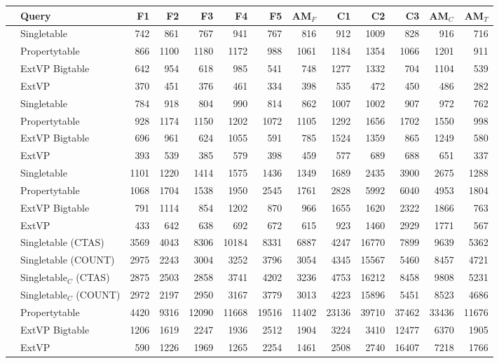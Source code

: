 \documentclass[
  a4paper,
  twocolumn
]{scrartcl}
\begin{document}
\begin{table*}[htb!]
  	\begin{tabular*}{\textwidth}{ @{\extracolsep{\fill}} llrrrrr|r|rrr|r|r }
		\midrule
		& Query & F1 & F2 & F3 & F4 & F5 & AM$_F$ & C1 & C2 & C3 & AM$_C$ & AM$_T$ \\ 
		\midrule
		\multirow{4}{*}{\rotatebox{90}{SF10}}  
		& Singletable & 742 & 861 & 767 & 941 & 767 & 816 & 912 & 1009 & 828 & 916 & 716 \\ 
		& Propertytable & 866 & 1100 & 1180 & 1172 & 988 & 1061 & 1184 & 1354 & 1066 & 1201 & 911 \\ 
		& ExtVP Bigtable & 642 & 954 & 618 & 985 & 541 & 748 & 1277 & 1332 & 704 & 1104 & 539 \\ 
		& ExtVP & 370 & 451 & 376 & 461 & 334 & 398 & 535 & 472 & 450 & 486 & 282 \\ 
		\midrule
		\multirow{4}{*}{\rotatebox{90}{SF100}} 
		& Singletable & 784 & 918 & 804 & 990 & 814 & 862 & 1007 & 1002 & 907 & 972 & 762 \\ 
		& Propertytable & 928 & 1174 & 1150 & 1202 & 1072 & 1105 & 1292 & 1656 & 1702 & 1550 & 998 \\ 
		& ExtVP Bigtable & 696 & 961 & 624 & 1055 & 591 & 785 & 1524 & 1359 & 865 & 1249 & 580 \\ 
		& ExtVP & 393 & 539 & 385 & 579 & 398 & 459 & 577 & 689 & 688 & 651 & 337 \\ 
		\midrule
		\multirow{4}{*}{\rotatebox{90}{SF1000}} 
		& Singletable & 1101 & 1220 & 1414 & 1575 & 1436 & 1349 & 1689 & 2435 & 3900 & 2675 & 1288 \\ 
		& Propertytable & 1068 & 1704 & 1538 & 1950 & 2545 & 1761 & 2828 & 5992 & 6040 & 4953 & 1804 \\ 
		& ExtVP Bigtable & 791 & 1114 & 854 & 1202 & 870 & 966 & 1655 & 1620 & 2322 & 1866 & 763 \\ 
		& ExtVP & 433 & 642 & 638 & 692 & 672 & 615 & 923 & 1460 & 2929 & 1771 & 567 \\ 
		\midrule
		\multirow{7}{*}{\rotatebox{90}{SF10000}} 
		& Singletable (CTAS) & 3569 & 4043 & 8306 & 10184 & 8331 & 6887 & 4247 & 16770 & 7899 & 9639 & 5362 \\ 
		& Singletable (COUNT) & 2975 & 2243 & 3004 & 3252 & 3796 & 3054 & 4345 & 15567 & 5460 & 8457 & 4721 \\ 
		& Singletable$_C$ (CTAS) & 2875 & 2503 & 2858 & 3741 & 4202 & 3236 & 4753 & 16212 & 8458 & 9808 & 5231 \\ 
		& Singletable$_C$ (COUNT) & 2972 & 2197 & 2950 & 3167 & 3779 & 3013 & 4223 & 15896 & 5451 & 8523 & 4686 \\ 
		& Propertytable & 4420 & 9316 & 12090 & 11668 & 19516 & 11402 & 23136 & 39710 & 37462 & 33436 & 11676 \\ 
		& ExtVP Bigtable & 1206 & 1619 & 2247 & 1936 & 2512 & 1904 & 3224 & 3410 & 12477 & 6370 & 1905 \\ 
		& ExtVP & 590 & 1226 & 1969 & 1265 & 2254 & 1461 & 2508 & 2740 & 16407 & 7218 & 1766 \\ 
		 \bottomrule
  	\end{tabular*}
 
\end{table*}
\end{document}
